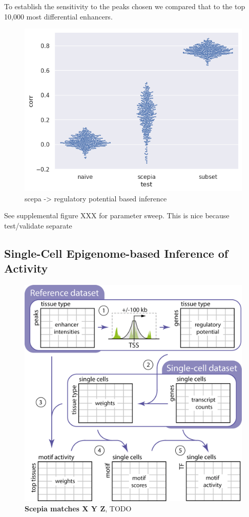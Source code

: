 To establish the sensitivity to the peaks chosen we compared that to the top 10,000 most differential enhancers.  

\begin{figure}
    \centering
    \includegraphics[width=0.75\linewidth]{ch.scepia/imgs/scepia_bulk_benchmark.png}
    \caption{scepa -> regulatory potential based inference}
    \label{fig:bulk_benchmark}
\end{figure}
See supplemental figure XXX for parameter sweep. This is nice because test/validate separate

\subsection{Single-Cell Epigenome-based Inference of Activity}

\begin{figure}
    \centering
    \includegraphics[width=1\linewidth]{ch.scepia/imgs/Middel 6OverviewFigureNumbers.png}
    \caption{\textbf{Scepia matches X Y Z}, TODO}
    \label{fig:enter-label}
\end{figure}


